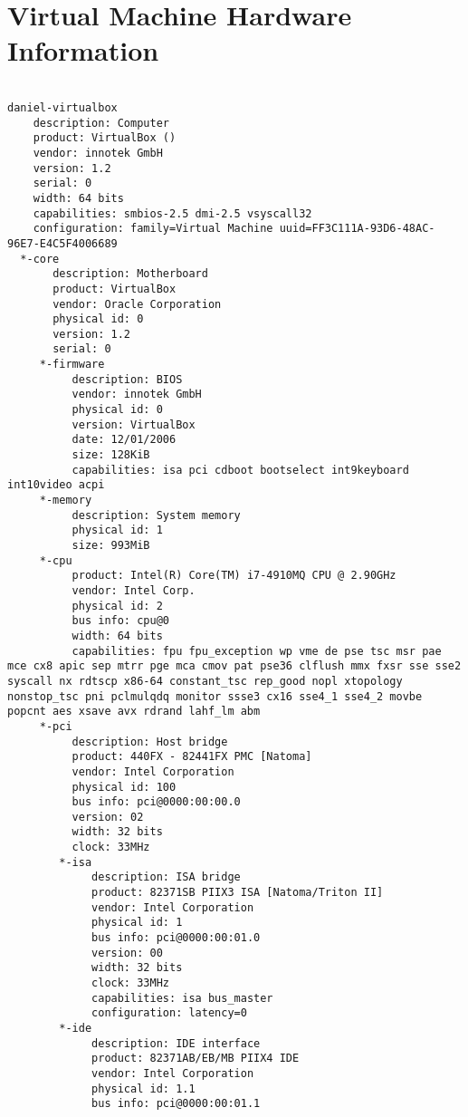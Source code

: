 \chapter{Virtual Machine Hardware Information} %
{

\label{VirtualMachineHardware} %
\begin{verbatim}

daniel-virtualbox         
    description: Computer
    product: VirtualBox ()
    vendor: innotek GmbH
    version: 1.2
    serial: 0
    width: 64 bits
    capabilities: smbios-2.5 dmi-2.5 vsyscall32
    configuration: family=Virtual Machine uuid=FF3C111A-93D6-48AC-96E7-E4C5F4006689
  *-core
       description: Motherboard
       product: VirtualBox
       vendor: Oracle Corporation
       physical id: 0
       version: 1.2
       serial: 0
     *-firmware
          description: BIOS
          vendor: innotek GmbH
          physical id: 0
          version: VirtualBox
          date: 12/01/2006
          size: 128KiB
          capabilities: isa pci cdboot bootselect int9keyboard int10video acpi
     *-memory
          description: System memory
          physical id: 1
          size: 993MiB
     *-cpu
          product: Intel(R) Core(TM) i7-4910MQ CPU @ 2.90GHz
          vendor: Intel Corp.
          physical id: 2
          bus info: cpu@0
          width: 64 bits
          capabilities: fpu fpu_exception wp vme de pse tsc msr pae mce cx8 apic sep mtrr pge mca cmov pat pse36 clflush mmx fxsr sse sse2 syscall nx rdtscp x86-64 constant_tsc rep_good nopl xtopology nonstop_tsc pni pclmulqdq monitor ssse3 cx16 sse4_1 sse4_2 movbe popcnt aes xsave avx rdrand lahf_lm abm
     *-pci
          description: Host bridge
          product: 440FX - 82441FX PMC [Natoma]
          vendor: Intel Corporation
          physical id: 100
          bus info: pci@0000:00:00.0
          version: 02
          width: 32 bits
          clock: 33MHz
        *-isa
             description: ISA bridge
             product: 82371SB PIIX3 ISA [Natoma/Triton II]
             vendor: Intel Corporation
             physical id: 1
             bus info: pci@0000:00:01.0
             version: 00
             width: 32 bits
             clock: 33MHz
             capabilities: isa bus_master
             configuration: latency=0
        *-ide
             description: IDE interface
             product: 82371AB/EB/MB PIIX4 IDE
             vendor: Intel Corporation
             physical id: 1.1
             bus info: pci@0000:00:01.1

\end{verbatim}}
